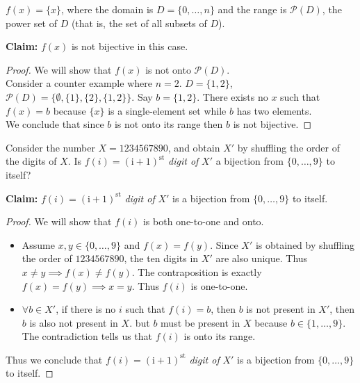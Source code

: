 \documentclass[11pt]{article}
\begin{document}
\begin{Parts}
    \Part $f(x) = \{x\}$, where the domain is $D = \{0,\dots, n\}$ and the range is $\mathcal P(D)$, the power set of $D$ (that is, the set of all subsets of $D$).
    \begin{Answer}
        \textbf{Claim:} $f(x)$ is not bijective in this case. 
        \begin{proof}
            We will show that $f(x)$ is not onto $\mathcal P(D)$. \\
            Consider a counter example where $n=2$. $D=\{1,2\}$, $\mathcal P(D)=\{\emptyset,\{1\},\{2\},\{1,2\}\}$. Say $b=\{1,2\}$.
            There exists no $x$ such that $f(x)=b$ because $\{x\}$ is a single-element set while $b$ has two elements. \\
            We conclude that since $b$ is not onto its range then $b$ is not bijective. 
        \end{proof}
    \end{Answer}

    \Part Consider the number $X = 1234567890$, and obtain $X'$ by shuffling the order of the digits of $X$. Is $f(i) = (\text{i} + 1)^{\text{st}}$ \textit{digit of} $X'$ a bijection from $\{0,\dots, 9\}$ to itself?
    \begin{Answer}
        \textbf{Claim:} $f(i) = (\text{i} + 1)^{\text{st}}$ \textit{digit of} $X'$ is a bijection from $\{0,\dots, 9\}$ to itself. 
        \begin{proof}
            We will show that $f(i)$ is both one-to-one and onto. 
            \begin{itemize}
                \item Assume $x,y \in \{0,\ldots,9\}$ and $f(x)=f(y)$. Since $X'$ is obtained by shuffling the order of $1234567890$, the ten digits in $X'$ are also unique. 
                      Thus $x \neq y \implies f(x) \neq f(y)$. The contraposition is exactly $f(x)=f(y) \implies x=y$. Thus $f(i)$ is one-to-one. 
                \item $\forall b \in X'$, if there is no $i$ such that $f(i)=b$, then $b$ is not present in $X'$, then $b$ is also not present in $X$. 
                      but $b$ must be present in $X$ because $b \in \{1,\ldots,9\}$. The contradiction tells us that $f(i)$ is onto its range. 
            \end{itemize}
            Thus we conclude that $f(i) = (\text{i} + 1)^{\text{st}}$ \textit{digit of} $X'$ is a bijection from $\{0,\dots, 9\}$ to itself. 
        \end{proof}
    \end{Answer}


\end{Parts}
\end{document}
